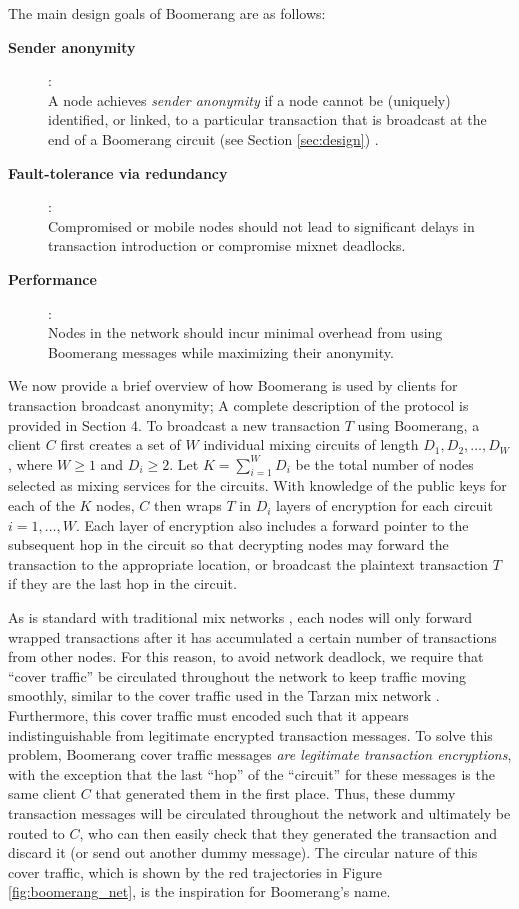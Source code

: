 The main design goals of Boomerang are as follows:
\begin{description}
	\item[{\bf Sender anonymity}]: \\A node achieves \emph{sender anonymity} if a node cannot be (uniquely) identified, or linked, to a particular transaction that is broadcast at the end of a Boomerang circuit (see Section \ref{sec:design}) \cite{AnonymityTerms}. 
	\item[{\bf Fault-tolerance via redundancy}]: \\Compromised or mobile nodes should not lead to significant delays in transaction introduction or compromise mixnet deadlocks.
	\item[{\bf Performance}]: \\Nodes in the network should incur minimal overhead from using Boomerang messages while maximizing their anonymity.
\end{description}

We now provide a brief overview of how Boomerang is used by clients for transaction broadcast anonymity; A complete description of the protocol is provided in Section 4. To broadcast a new transaction $T$ using Boomerang, a client $C$ first creates a set of $W$ individual mixing circuits of length $D_1,D_2,\dots,D_W$, where $W \geq 1$ and $D_i \geq 2$. Let $K = \sum_{i=1}^WD_i$ be the total number of nodes selected as mixing services for the circuits. With knowledge of the public keys for each of the $K$ nodes, $C$ then wraps $T$ in $D_i$ layers of encryption for each circuit $i = 1,\dots,W$. Each layer of encryption also includes a forward pointer to the subsequent hop in the circuit so that decrypting nodes may forward the transaction to the appropriate location, or broadcast the plaintext transaction $T$ if they are the last hop in the circuit. 

As is standard with traditional mix networks \cite{Chaum81-Mix}, each nodes will only forward wrapped transactions after it has accumulated a certain number of transactions from other nodes. For this reason, to avoid network deadlock, we require that ``cover traffic'' be circulated throughout the network to keep traffic moving smoothly, similar to the cover traffic used in the Tarzan mix network \cite{tarzan}. Furthermore, this cover traffic must encoded such that it appears indistinguishable from legitimate encrypted transaction messages. To solve this problem, Boomerang cover traffic messages \emph{are legitimate transaction encryptions}, with the exception that the last ``hop'' of the ``circuit'' for these messages is the same client $C$ that generated them in the first place. Thus, these dummy transaction messages will be circulated throughout the network and ultimately be routed to $C$, who can then easily check that they generated the transaction and discard it (or send out another dummy message). The circular nature of this cover traffic, which is shown by the red trajectories in Figure \ref{fig:boomerang_net}, is the inspiration for Boomerang's name.

